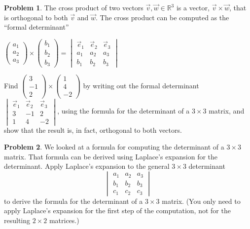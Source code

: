 \documentclass[11pt]{article}
\newcommand{\R}{{\mathbb R}}
\theoremstyle{definition}
\newtheorem{problem}{Problem}
\newenvironment{answer}{\par\bigskip\bgroup\color{darkblue}}{\egroup}
\begin{document}
\begin{problem}
The cross product of two vectors $\vec v,\vec w\in \R^3$ is a vector, $\vec v\times \vec w$, that 
is orthogonal  to both $\vec v$ and $\vec w$.  The cross product can be computed as the
``formal determinant''

\medskip
\centerline{$\begin{pmatrix}a_1\\a_2\\a_3\end{pmatrix}
            \times \begin{pmatrix}b_1\\b_2\\b_3\end{pmatrix}
            =\begin{vmatrix}\vec e_1&\vec e_2&\vec e_3\\ a_1&a_2&a_3\\ b_1&b_2&b_3\end{vmatrix}$}

\medskip
\noindent Find $\begin{pmatrix} 3\\-1\\2 \end{pmatrix} \times \begin{pmatrix} 1 \\ 4 \\ -2 \end{pmatrix}$
by writing out the formal determinant 
$\begin{vmatrix}\vec e_1&\vec e_2&\vec e_3\\ 3& -1 & 2 \\ 1 & 4 & -2 \end{vmatrix}$,
using the formula\vadjust{\medskip} for the determinant of a $3\times3$ matrix,
and show that the result is, in fact, orthogonal to both vectors.
\end{problem}

\begin{answer}
\end{answer}




\begin{problem}
We looked at a formula for computing the determinant of a $3\times3$ matrix.  That formula can be derived using
Laplace's expansion for the determinant.  Apply Laplace's expansion to the general $3\times3$ determinant
$$\begin{vmatrix} a_1& a_2& a_3 \\ b_1& b_2& b_3 \\ c_1& c_2& c_3 \end{vmatrix}$$
to derive the formula for the determinant of a $3\times3$ matrix.  (You only need to apply Laplace's expansion
for the first step of the computation, not for the resulting $2\times2$ matrices.)
\end{problem}
\end{document}

